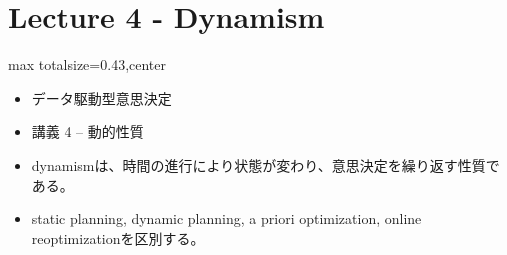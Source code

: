 \section*{Lecture 4 - Dynamism}

\clearpage
{}
\begin{minipage}[t]{0.405\textwidth}
\begin{adjustbox}{max totalsize={\textwidth}{0.43\textheight},center}
\begin{minipage}{\textwidth}\scriptsize
{}\begin{itemize}
\item データ駆動型意思決定
\item 講義 4 – 動的性質
\end{itemize}\begin{itemize}
\item dynamismは、時間の進行により状態が変わり、意思決定を繰り返す性質である。
\item static planning, dynamic planning, a priori optimization, online reoptimizationを区別する。
\end{itemize}
\end{minipage}
\end{adjustbox}
\end{minipage}\hfill
